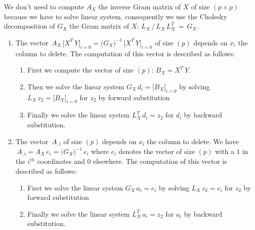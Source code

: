 We don't need to compute $A_X$ the inverse Gram matrix of $X$ of size $(p\times p)$ because we have to solve linear system, consequently
we use the Cholesky decomposition of $G_X$ the Gram matrix of $X$: $L_X  \,/\, L_X\,L_X^T\,=\,G_X$.
\begin{enumerate}
\item The vector $\,A_X\,\big[X^T\,Y\big]_{i=0}=\big(G_X\big)^{-1}\,\big[X^T\,Y\big]_{i=0}$ of size $(p)$ depends on $x_i$ the column to delete.
The computation of this vector is described as follows:
\begin{enumerate}
\item First we compute the vector of size $(p)$: $B_X=X^T\,Y$.
\item Then we solve the linear system $G_X \,d_i= \big[B_X\big]_{i=0}$ by solving $L_X\,z_2= \big[B_X\big]_{i=0}$ for $z_2$ by forward substitution
\item Finally we solve the linear system $L_X^T\,d_i=z_2$ for $d_i$ by backward substitution.
\end{enumerate}
\item The vector $\,A_{,i}$ of size $(p)$ depends on $x_i$ the column to delete.
We have $\,A_{,i}=A_X \, e_i=\big(G_X\big)^{-1}\,e_i$  where $e_i$ denotes the vector of size $(p)$ with a $1$ in the $i^{th}$ coordinates and $0$ elsewhere.
The computation of this vector is described as follows:
\begin{enumerate}
\item First we solve the linear system $G_X \,a_i= e_i$ by solving $L_X\,z_2= e_i$ for $z_2$ by forward substitution
\item Finally we solve the linear system $L_X^T\,a_i=z_2$ for $a_i$ by backward substitution.
\end{enumerate}
\end{enumerate}


\newpage
